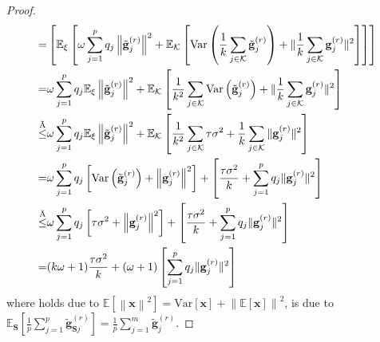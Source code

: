 \documentclass[sigconf, anonymous, review]{acmart}
\begin{document}
\begin{proof}
\begin{align}
\stackrel{}{=} &\left[\mathbb{E}_{\xi}\left[{\omega}\sum_{j=1}^pq_j\left\|\tilde{\mathbf{g}}_{j}^{(r)}\right\|^2+\mathbb{E}_{\mathcal{K}}\left[\text{Var}\left(\frac{1}{k}\sum_{j\in\mathcal{K}}\tilde{\mathbf{g}}_{j}^{(r)}\right)+\|\frac{1}{k}\sum_{j\in\mathcal{K}}{\mathbf{g}}_{j}^{(r)}\|^2\right]\right]\right]\nonumber\\
\stackrel{}{=}& {\omega}\sum_{j=1}^pq_j\mathbb{E}_{\xi}\left\|\tilde{\mathbf{g}}_{j}^{(r)}\right\|^2+\mathbb{E}_{\mathcal{K}}\left[\frac{1}{k^2}\sum_{j\in\mathcal{K}}\text{Var}\left(\tilde{\mathbf{g}}_{j}^{(r)}\right)+\|\frac{1}{k}\sum_{j\in\mathcal{K}}{\mathbf{g}}_{j}^{(r)}\|^2\right]\nonumber\\
\stackrel{\ding{195}}{\leq}&{\omega}\sum_{j=1}^pq_j\mathbb{E}_{\xi}\left\|\tilde{\mathbf{g}}_{j}^{(r)}\right\|^2+\mathbb{E}_{\mathcal{K}}\left[\frac{1}{k^2}\sum_{j\in\mathcal{K}}\tau\sigma^2+\frac{1}{k}\sum_{j\in\mathcal{K}}\|{\mathbf{g}}_{j}^{(r)}\|^2\right]\nonumber\\
=&{\omega}\sum_{j=1}^pq_j\left[\text{Var}\left(\tilde{\mathbf{g}}_{j}^{(r)}\right)+\left\|\mathbf{g}_{j}^{(r)}\right\|^2\right]+\left[\frac{\tau\sigma^2}{k}+\sum_{j=1}^pq_j\|{\mathbf{g}}_{j}^{(r)}\|^2\right]\nonumber\\
\stackrel{\ding{196}}{\leq}&{\omega}\sum_{j=1}^pq_j\left[\tau\sigma^2+\left\|\mathbf{g}_{j}^{(r)}\right\|^2\right]+\left[\frac{\tau\sigma^2}{k}+\sum_{j=1}^pq_j\|{\mathbf{g}}_{j}^{(r)}\|^2\right]\nonumber\\
=&(k\omega+1)\frac{\tau\sigma^2}{k}+(\omega+1)\left[\sum_{j=1}^pq_j\|{\mathbf{g}}_{j}^{(r)}\|^2\right]\label{eq:lemma111}%
\end{align}
where  holds due to $\mathbb{E}\left[\left\|\boldsymbol{x}\right\|^2\right]=\text{Var}[\boldsymbol{x}]+\left\|\mathbb{E}[\boldsymbol{x}]\right\|^2$,  is due to $\mathbb{E}_{\mathbf{S}}\left[\frac{1}{p}\sum_{j=1}^p\tilde{\mathbf{g}}_{\mathbf{S}j}^{(r)}\right]=\frac{1}{p}\sum_{j=1}^m\tilde{\mathbf{g}}_{j}^{(r)}$.



\end{proof}
\end{document}

